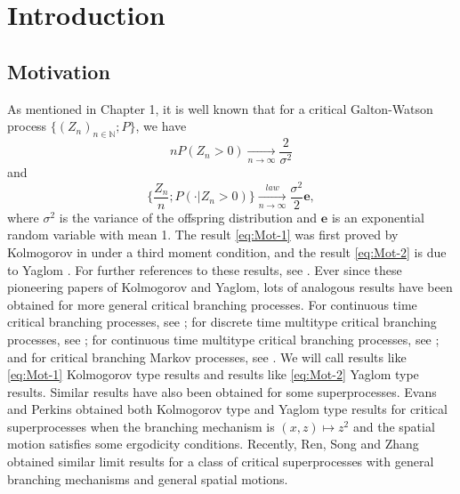 \documentclass[UTF8]{pkuthss}
\theoremstyle{plain}
\theoremstyle{definition}
\numberwithin{equation}{section}
\begin{document}
\section{Introduction}
\subsection{Motivation}
\label{sec: Motivation}
	As mentioned in Chapter 1, it is well known that for a critical Galton-Watson process $\{(Z_n)_{n\in \mathbb N};P\}$, we have
\begin{equation}
\label{eq:Mot-1}
	nP(Z_n>0)
	\xrightarrow[n\to\infty]{} \frac{2}{\sigma^2}
\end{equation}
	and
\begin{equation}
\label{eq:Mot-2}
	\Big\{\frac{Z_n}{n}; P(\cdot|Z_n>0)\Big\}
	\xrightarrow[n\to\infty]{law} \frac{\sigma^2}{2} \mathbf e,
\end{equation}
	where $\sigma^2$ is the variance of the offspring distribution and $\mathbf e$ is an exponential random variable with mean 1.
	The result \eqref{eq:Mot-1} was first proved by Kolmogorov in \cite{Kolmogorov1938Zur} under a third moment condition, and the result \eqref{eq:Mot-2} is due to Yaglom \cite{Yaglom1947Certain}.
	For further references to these results, see \cite{Harris2002Theory, KestenNeySpitzer1966GaltonWatson}.
	Ever since these pioneering papers of Kolmogorov and Yaglom, lots of analogous results
	have been obtained for more general critical branching processes.
	For continuous time critical branching processes, see \cite{AthreyaNey1972Branching}; for discrete time multitype critical branching processes, see \cite{AthreyaNey1972Branching, JoffeSpitzer1967Multitype}; for continuous time multitype critical branching processes, see \cite{AthreyaNey1974Functionals}; and for critical branching Markov processes, see \cite{AsmussenHering1983Branching}.
	We will call results like \eqref{eq:Mot-1} Kolmogorov type results and results like \eqref{eq:Mot-2} Yaglom type results.
	Similar results have also been obtained for some superprocesses.
	Evans and Perkins \cite{EvansPerkins1990Measurevalued} obtained both Kolmogorov type and Yaglom type results for critical superprocesses when the branching mechanism is $(x,z) \mapsto z^2$ and the spatial motion satisfies some ergodicity conditions.
	Recently, Ren, Song and Zhang \cite{RenSongZhang2015Limit} obtained similar limit results for a class of critical superprocesses with general branching mechanisms and general spatial motions.
\end{document}
